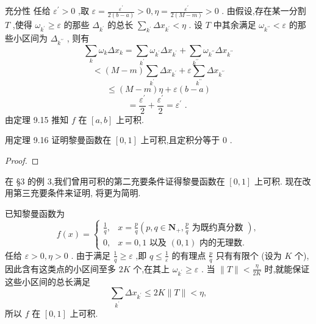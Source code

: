 充分性 任给 \({\varepsilon }^{\prime } > 0\) ,取 \(\varepsilon  = \frac{{\varepsilon }^{\prime }}{2\left( {b - a}\right) } > 0,\eta  = \frac{{\varepsilon }^{\prime }}{2\left( {M - m}\right) } > 0\) . 由假设,存在某一分割 \(T\) ,使得 \({\omega }_{{k}^{\prime }} \geq  \varepsilon\) 的那些 \({\Delta }_{{k}^{\prime }}\) 的总长 \(\mathop{\sum }\limits_{{k}^{\prime }}\Delta {x}_{{k}^{\prime }} < \eta\) . 设 \(T\) 中其余满足 \({\omega }_{{k}^{\prime \prime }} < \varepsilon\) 的那些小区间为 \({\Delta }_{{k}^{\prime \prime }}\) , 则有
\[
\mathop{\sum }\limits_{k}{\omega }_{k}\Delta {x}_{k} = \mathop{\sum }\limits_{{k}^{\prime }}{\omega }_{{k}^{\prime }}\Delta {x}_{{k}^{\prime }} + \mathop{\sum }\limits_{{k}^{\prime \prime }}{\omega }_{{k}^{\prime \prime }}\Delta {x}_{{k}^{\prime \prime }}
\]
\[
< \left( {M - m}\right) \mathop{\sum }\limits_{{k}^{\prime }}\Delta {x}_{{k}^{\prime }} + \varepsilon \mathop{\sum }\limits_{{k}^{\prime \prime }}\Delta {x}_{{k}^{\prime \prime }}
\]
\[
\leq  \left( {M - m}\right) \eta  + \varepsilon \left( {b - a}\right)
\]
\[
= \frac{{\varepsilon }^{\prime }}{2} + \frac{{\varepsilon }^{\prime }}{2} = {\varepsilon }^{\prime }\text{ . }
\]
由定理 9.15 推知 \(f\) 在 \(\left\lbrack  {a,b}\right\rbrack\) 上可积.

\begin{example}

\end{example}
用定理 9.16 证明黎曼函数在 \(\left\lbrack  {0,1}\right\rbrack\) 上可积,且定积分等于 0 .

\begin{proof}

\end{proof}
在 §3 的例 3,我们曾用可积的第二充要条件证得黎曼函数在 \(\left\lbrack  {0,1}\right\rbrack\) 上可积. 现在改用第三充要条件来证明, 将更为简明.

已知黎曼函数为
\[
f\left( x\right)  = \left\{  \begin{array}{ll} \frac{1}{q}, & x = \frac{p}{q}\left( {p,q \in  {\mathbf{N}}_{ + },\frac{p}{q}\text{ 为既约真分数 }}\right) , \\  0, & x = 0,1\text{ 以及 }\left( {0,1}\right) \text{ 内的无理数. } \end{array}\right.
\]
任给 \(\varepsilon  > 0,\eta  > 0\) . 由于满足 \(\frac{1}{q} \geq  \varepsilon\) ,即 \(q \leq  \frac{1}{\varepsilon }\) 的有理点 \(\frac{p}{q}\) 只有有限个 (设为 \(K\) 个),因此含有这类点的小区间至多 \({2K}\) 个,在其上 \({\omega }_{{k}^{\prime }} \geq  \varepsilon\) . 当 \(\parallel T\parallel  < \frac{\eta }{2K}\) 时,就能保证这些小区间的总长满足
\[
\mathop{\sum }\limits_{{k}^{\prime }}\Delta {x}_{{k}^{\prime }} \leq  {2K}\parallel T\parallel  < \eta ,
\]
所以 \(f\) 在 \(\left\lbrack  {0,1}\right\rbrack\) 上可积.

